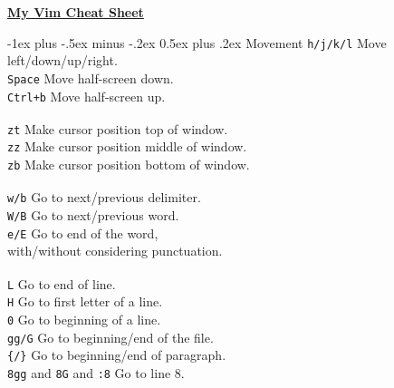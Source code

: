 \documentclass[10pt,landscape]{article}
\makeatletter
\renewcommand{\section}{\@startsection{section}{1}{0mm}%
                                {-1ex plus -.5ex minus -.2ex}%
                                {0.5ex plus .2ex}%
                                {\normalfont\large\bfseries}}
\makeatother
\begin{document}
\raggedright
\begin{multicols}{3}

\setlength{\columnseprule}{0.25pt}
\setlength{\premulticols}{1pt}
\setlength{\postmulticols}{1pt}
\setlength{\multicolsep}{1pt}
\setlength{\columnsep}{2pt}

\begin{center}
     \Large{\underline{\textbf{My Vim Cheat Sheet}}} \\
\end{center}


\section{Movement}
\verb!h/j/k/l! \hfill Move left/down/up/right.\\
\verb!Space! \hfill Move half-screen down.\\
\verb!Ctrl+b! \hfill Move half-screen up.\\
\verb! !\\
\verb!zt! \hfill Make cursor position top of window.\\
\verb!zz! \hfill Make cursor position middle of window.\\
\verb!zb! \hfill Make cursor position bottom of window.\\
\verb! !\\
\verb!w/b! \hfill Go to next/previous delimiter.\\
\verb!W/B! \hfill Go to next/previous word.\\
\verb!e/E! \hfill Go to end of the word, \\ \hfill with/without considering punctuation.\\
\verb! !\\
\verb!L! \hfill Go to end of line.\\
\verb!H! \hfill Go to first letter of a line.\\
\verb!0! \hfill Go to beginning of a line.\\
\verb!gg/G! \hfill Go to beginning/end of the file.\\
\verb!{/}! \hfill Go to beginning/end of paragraph.\\ 
\verb!8gg! and \verb!8G! and \verb!:8! \hfill Go to line 8.\\
\verb! !\\

\end{multicols}
\end{document}
